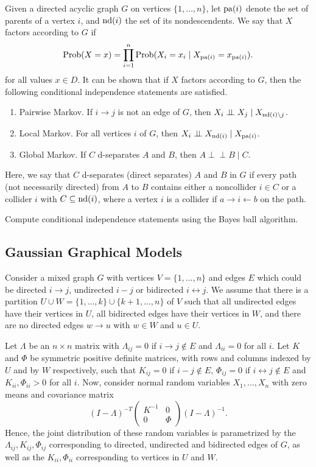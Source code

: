 \documentclass[10pt]{article}
\theoremstyle{definition}
\newcommand{\Prob}{{\rm Prob}}
\newcommand{\pa}{{\rm pa}}
\newcommand{\nd}{{\rm nd}}
\def\ci{\perp\!\!\!\perp}
\begin{document}
Given a directed acyclic graph $G$ on vertices $\{1, \ldots,
n\}$, let $\pa(i)$ denote the set of parents of a vertex $i$, and
$\nd(i)$ the set of its nondescendents. We say that $X$ factors according to $G$ if
$$\Prob(X=x) = \prod_{i=1}^n \Prob(X_i=x_i \mid X_{\pa(i)} = x_{\pa(i)}).
$$
for all values $x \in D$. It can be shown that if $X$ factors
according to $G$, then the following conditional independence
statements are satisfied.
\begin{enumerate}
\item Pairwise Markov. If $i \rightarrow j$ is not an edge
  of $G$, then 
$X_i \ci X_j \mid X_{\nd(i)\setminus j}  $.
\item Local Markov. For all vertices $i$ of $G$,
then $X_i \ci X_{\nd(i)} \mid X_{\pa(i)}$.
\item Global Markov. If $C$ d-separates $A$ and $B$, then $A \ci B
  \mid C$.
\end{enumerate}
Here, we say that $C$ d-separates (direct separates) $A$ and $B$ in $G$ if
every path (not necessarily directed) from $A$ to $B$ contains either a
noncollider $i \in C$ or a collider $i$ with $C \subseteq \nd(i)$,
where a vertex $i$ is a collider if $a\rightarrow i
\leftarrow b$ on the path.

Compute conditional independence statements using the Bayes ball
algorithm.

\subsection{Gaussian Graphical Models}

Consider a mixed graph $G$ with vertices $V=\{1, \ldots, n\}$ and edges
$E $ which could be directed $i \rightarrow j$,
undirected $i - j$ or bidirected $i \leftrightarrow
j$. We assume that there is a partition $U \cup W = \{1, \ldots, k\} \cup
\{k+1,\ldots, n\}$ of $V$ such that all undirected edges have
their vertices in $U$, all bidirected edges have
their vertices in $W$, and there are no directed edges $w \rightarrow
u$ with $w \in W$ and $u \in U$. 

Let $\Lambda$ be an $n{\times}n$ matrix with $\Lambda_{ij}=0$ if $i
\rightarrow j \notin E$ and $\Lambda_{ii}=0$ for all $i$. Let $K$ and $\Phi$ be symmetric positive
definite matrices, with rows and columns indexed by $U$ and by $W$ respectively, such that $K_{ij}=0$ if
$i-j \notin E$, $\Phi_{ij}=0$ if $i\leftrightarrow j \notin E$ and
$K_{ii}, \Phi_{ii} > 0$ for all $i$. Now, consider normal random
variables $X_1, \ldots, X_n$ with zero means and covariance matrix
$$
(I-\Lambda)^{-T} \begin{pmatrix} K^{-1} & 0 \\ 0 & \Phi \end{pmatrix}
(I-\Lambda)^{-1}.
$$
Hence, the joint distribution of these random variables is
parametrized by the $\Lambda_{ij}, K_{ij}, \Phi_{ij}$ corresponding to
directed, undirected and bidirected edges of $G$, as well as the
$K_{ii}, \Phi_{ii}$ corresponding to vertices in $U$ and $W$.
\end{document}

